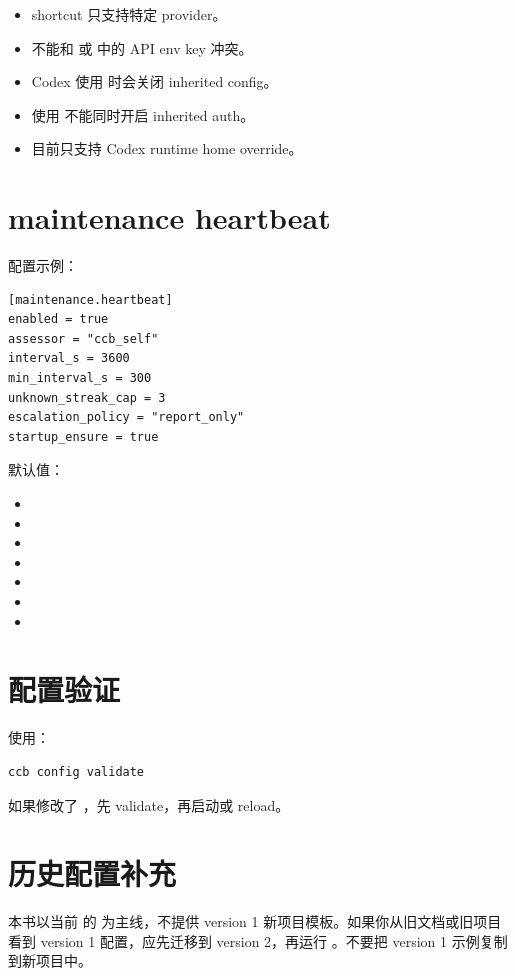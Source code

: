 \begin{itemize}
  \item shortcut 只支持特定 provider。
  \item 不能和  或  中的 API env key 冲突。
  \item Codex 使用  时会关闭 inherited config。
  \item 使用  不能同时开启 inherited auth。
  \item {} 目前只支持 Codex runtime home override。
\end{itemize}

\section{maintenance heartbeat}

配置示例：

\begin{lstlisting}
[maintenance.heartbeat]
enabled = true
assessor = "ccb_self"
interval_s = 3600
min_interval_s = 300
unknown_streak_cap = 3
escalation_policy = "report_only"
startup_ensure = true
\end{lstlisting}

默认值：

\begin{itemize}
  \item {}
  \item {}
  \item {}
  \item {}
  \item {}
  \item {}
  \item {}
\end{itemize}

\section{配置验证}

使用：

\begin{lstlisting}
ccb config validate
\end{lstlisting}

如果修改了 ，先 validate，再启动或 reload。

\section{历史配置补充}

本书以当前  的  为主线，不提供 version 1 新项目模板。如果你从旧文档或旧项目看到 version 1 配置，应先迁移到 version 2，再运行 。不要把 version 1 示例复制到新项目中。
